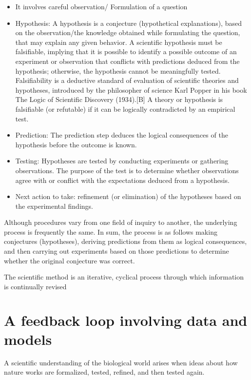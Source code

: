 \documentclass[
]{book}
\theoremstyle{definition}
\theoremstyle{definition}
\theoremstyle{definition}
\theoremstyle{definition}
\theoremstyle{remark}
\begin{document}
\begin{itemize}
\item
  It involves careful observation/ Formulation of a question
\item
  Hypothesis: A hypothesis is a conjecture (hypothetical explanations), based on the observation/the knowledge obtained while formulating the question, that may explain any given behavior. A scientific hypothesis must be falsifiable, implying that it is possible to identify a possible outcome of an experiment or observation that conflicts with predictions deduced from the hypothesis; otherwise, the hypothesis cannot be meaningfully tested.
  Falsifiability is a deductive standard of evaluation of scientific theories and hypotheses, introduced by the philosopher of science Karl Popper in his book The Logic of Scientific Discovery (1934).{[}B{]} A theory or hypothesis is falsifiable (or refutable) if it can be logically contradicted by an empirical test.
\item
  Prediction: The prediction step deduces the logical consequences of the hypothesis before the outcome is known.
\item
  Testing: Hypotheses are tested by conducting experiments or gathering observations. The purpose of the test is to determine whether observations agree with or conflict with the expectations deduced from a hypothesis.
\item
  Next action to take: refinement (or elimination) of the hypotheses based on the experimental findings.
\end{itemize}

Although procedures vary from one field of inquiry to another, the underlying process is frequently the same. In sum, the process is as follows making conjectures (hypotheses), deriving predictions from them as logical consequences, and then carrying out experiments based on those predictions to determine whether the original conjecture was correct.

The scientific method is an iterative, cyclical process through which information is continually revised

\section{A feedback loop involving data and models}\label{a-feedback-loop-involving-data-and-models}

A scientific understanding of the biological world arises when ideas about how nature works are formalized, tested, refined, and then tested again.
\end{document}
